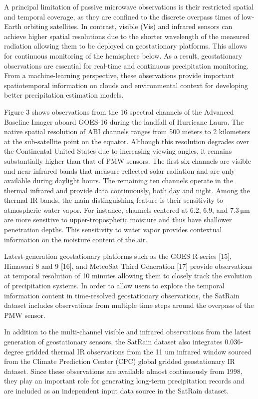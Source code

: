 \documentclass[11pt]{article}
\begin{document}
A principal limitation of passive microwave observations is their restricted
spatial and temporal coverage, as they are confined to the discrete overpass
times of low-Earth orbiting satellites. In contrast, visible (Vis) and infrared
sensors can achieve higher spatial resolutions due to the shorter wavelength of
the measured radiation allowing them to be deployed on geostationary platforms.
This allows for continuous monitoring of the hemisphere below. As a result,
geostationary observations are essential for real-time and continuous
precipitation monitoring. From a machine-learning perspective, these
observations provide important spatiotemporal information on clouds and
environmental context for developing better precipitation estimation models.

Figure 3 shows observations from the 16 spectral channels of the Advanced
Baseline Imager aboard GOES-16 during the landfall of Hurricane Laura. The
native spatial resolution of ABI channels ranges from 500 meters to 2 kilometers
at the sub-satellite point on the equator. Although this resolution degrades
over the Continental United States due to increasing viewing angles, it remains
substantially higher than that of PMW sensors. The first six channels are
visible and near-infrared bands that measure reflected solar radiation and are
only available during daylight hours. The remaining ten channels operate in the
thermal infrared and provide data continuously, both day and night. Among the
thermal IR bands, the main distinguishing feature is their sensitivity to
atmospheric water vapor. For instance, channels centered at 6.2, 6.9, and 7.3 µm
are more sensitive to upper-tropospheric moisture and thus have shallower
penetration depths. This sensitivity to water vapor provides contextual
information on the moisture content of the air.

Latest-generation geostationary platforms such as the GOES R-series [15],
Himawari 8 and 9 [16], and MeteoSat Third Generation [17] provide observations
at temporal resolution of 10 minutes allowing them to closely track the
evolution of precipitation systems. In order to allow users to explore the
temporal information content in time-resolved geostationary observations, the
SatRain dataset includes observations from multiple time steps around the
overpass of the PMW sensor.

In addition to the multi-channel visible and infrared observations from the
latest generation of geostationary sensors, the SatRain dataset also integrates
0.036-degree gridded thermal IR observations from the 11 um infrared window
sourced from the Climate Prediction Center (CPC) global gridded geostationary IR
dataset. Since these observations are available almost continuously from 1998,
they play an important role for generating long-term precipitation records and
are included as an independent input data source in the SatRain dataset.
\end{document}
